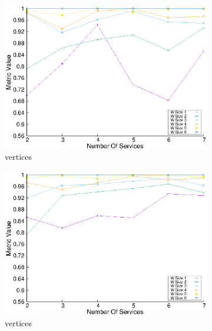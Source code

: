 \begin{figure}[H]
\begin{subfigure}{0.45\textwidth}
    \includegraphics[width=\textwidth]{Images/graphs/window_quality_performance_diff_perce_n7_s7_20_100_n6}
    \caption{ vertices}
    \label{fig:quality_window_perce_wide_6n}
  \end{subfigure}
  \hfill
  \begin{subfigure}{0.45\textwidth}
    \includegraphics[width=\textwidth]{Images/graphs/window_quality_performance_diff_perce_n7_s7_50_89_n6}
    \caption{ vertices}
    \label{fig:quality_window_average_perce_6n}
  \end{subfigure}
  \begin{subfigure}{0.45\textwidth}

\end{subfigure}
\end{figure}
